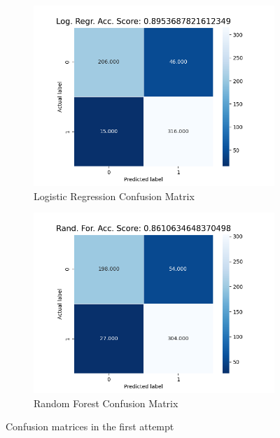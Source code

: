 \documentclass[10pt, conference]{IEEEtran}
\begin{document}
\begin{figure}[t]
    \centering
    \begin{subfigure}[b]{.45\linewidth}
        \centering
        \includegraphics[width=\linewidth]{resources/confusion_matrix_basic_features_logreg.png}
        \caption{Logistic Regression Confusion Matrix}
        \label{fig:confusion-matrix-first-attempt-randfor}
    \end{subfigure}%
    \begin{subfigure}[b]{.45\linewidth}
        \centering
        \includegraphics[width=\linewidth]{resources/confusion_matrix_basic_features_randfor.png}
        \caption{Random Forest Confusion Matrix}
        \label{fig:confusion-matrix-first-attempt-logreg}
    \end{subfigure}
    \caption{Confusion matrices in the first attempt}
    \label{fig:confusion-matrix-first-attempt}
\end{figure}
\end{document}
